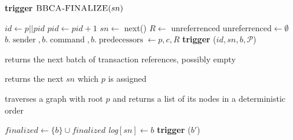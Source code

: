 \begin{algorithm}
\begin{algorithmic}[1]
				\State\textbf{trigger} $\textsc{BBCA-FINALIZE}(sn)$ 
			\EndIf
	\EndUponEvent
	
		\State $id\gets p||pid$
		\State $pid\gets pid+1$
		\State $sn\gets$ next()
		\State $R\gets$ unreferrenced
		\State unreferrenced$\gets\emptyset$
		\State $b.\operatorname{sender}, b.\operatorname{command}, b.\operatorname{predecessors}
				\gets p, c, R$
		\State \textbf{trigger} \bbcacast($id, sn, b, \mathcal{P}$)
	\EndFunction
	
		\State returns the next batch of transaction references, possibly empty
	\EndFunctionNoArgs
	
		\State returns the next $sn$ which $p$ is assigned
	\EndFunctionNoArgs
	 
		\State traverses a graph with root $p$ and returns a list of its nodes in a deterministic order
	\EndFunction
	
		\State $\textit{finalized}\gets\{b\}\cup\textit{finalized}$
			\State \textit{log}$[sn]\gets b$	
			\State \textbf{trigger} \eagercommit($b'$)
		\EndIf
	\EndFunction
	\caption{\system implementation (continues).}	
	\label{alg:sb-impl-pt2}
  \end{algorithmic}
\end{algorithm}
